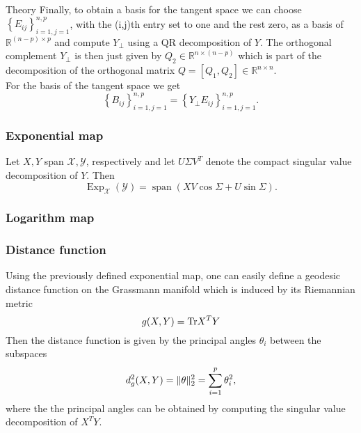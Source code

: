 \begin{chapter}{Theory}
Finally, to obtain a basis for the tangent space we can choose $\left\lbrace E_{ij}\right\rbrace_{i=1,j=1}^{n,p}$, with the (i,j)th entry set to one and the rest zero,
as a basis of $\mathbb{R}^{(n-p)\times p}$ and compute $Y_{\bot}$ using a QR decomposition of $Y$. The orthogonal complement $Y_{\bot}$ is then just given by 
$Q_2\in\mathbb{R}^{n\times (n-p)}$ which is part of the decomposition of the orthogonal matrix $Q=[Q_1,Q_2]\in\mathbb{R}^{n\times n}$.\\
For the basis of the tangent space we get 
\begin{equation}
    \left\lbrace B_{ij}\right\rbrace_{i=1,j=1}^{n,p}=\left\lbrace Y_{\bot}E_{ij}\right\rbrace_{i=1,j=1}^{n,p}.
\end{equation}

\subsubsection{Exponential map} %
\label{ssub:Exponential map}
Let $X, Y$ span $\mathcal{X}, \mathcal{Y}$, respectively and let $U\Sigma V^{T}$ denote the compact singular value decomposition of $Y$. Then
\begin{equation}
    \operatorname{Exp}_{\mathcal{X}}(\mathcal{Y})=\operatorname{span}\left( XV\cos\Sigma + U\sin\Sigma\right).
\end{equation}

\subsubsection{Logarithm map} %
\label{ssub:Logarithm map}


\subsubsection{Distance function} %
\label{ssub:Distance function}
Using the previously defined exponential map, one can easily define a geodesic distance function on the Grassmann manifold which is induced by its Riemannian metric
\begin{equation}
    g(X,Y) = \textnormal{Tr} X^TY
\end{equation}
Then the distance function is given by the principal angles $\theta_i$ between the subspaces 
\begin{equation}
    \label{eq:gr_geod_dist}
    d_g^2(X,Y) = \| \theta \|_2^2=\sum_{i=1}^p\theta_i^2,
\end{equation}
where the the principal angles can be obtained by computing the singular value decomposition of $X^TY$.


\end{chapter}
